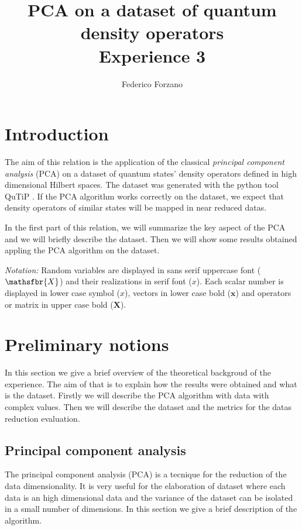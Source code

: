 \documentclass[%
    twoside, 
    a4paper
    ]{article}
\title{PCA on a dataset of quantum density operators\\\large{Experience 3}}
\author{Federico Forzano}
\date{}
\DeclareRobustCommand{\msf}[1]{%
  \ifcat\noexpand#1\relax\msfgreek{#1}\else\mathsfbr{#1}\fi%
}
\begin{document}
\maketitle

\section{Introduction}
    The aim of this relation is the application of the classical \emph{principal component analysis} (PCA) on 
    a dataset of quantum states' density operators defined in high dimensional Hilbert spaces.
    The dataset was generated with the python tool QuTiP \cite{Johansson_2012,Johansson_2013}.
    If the PCA algorithm works correctly on the dataset, we expect that density operators of 
    similar states will be mapped in near reduced datas.

    In the first part of this relation, we will summarize the key aspect of the PCA and we will 
    briefly describe the dataset.
    Then we will show some results obtained appling the PCA algorithm on the dataset.
    
    \emph{Notation:} Random variables are displayed in sans serif uppercase font ($\msf{X}$) and their 
    realizations in serif font ($x$). Each scalar number is displayed in lower case symbol ($x$),
    vectors in lower case bold ($\bm{x}$) and operators or matrix in upper case bold ($\bm{X}$).
%
\section{Preliminary notions}
    In this section we give a brief overview of the theoretical backgroud of the experience.
    The aim of that is to explain how the results were obtained and what is the dataset.
    Firstly we will describe the PCA algorithm with data with complex values. Then we will 
    describe the dataset and the metrics for the datas reduction evaluation.
    
    \subsection{Principal component analysis}
        The principal component analysis (PCA) is a tecnique for the reduction of the data
        dimensionality. It is very useful for the elaboration of dataset where each data 
        is an high dimensional data and the variance of the dataset can be isolated in a small
        number of dimensions. In this section we give a brief description of the algorithm.
        
\end{document}
